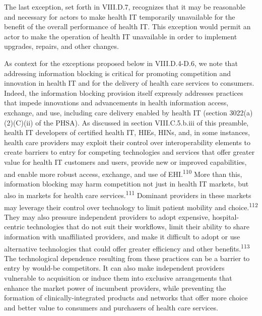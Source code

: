 \documentclass[twoside,11pt]{article}
\begin{document}
          The last exception, set forth in VIII.D.7, recognizes that it may be reasonable and necessary for actors to make health IT temporarily unavailable for the benefit of the overall performance of health IT. This exception would permit an actor to make the operation of health IT unavailable in order to implement upgrades, repairs, and other changes.


          As context for the exceptions proposed below in VIII.D.4-D.6, we note that addressing information blocking is critical for promoting competition and innovation in health IT and for the delivery of health care services to consumers. Indeed, the information blocking provision itself expressly addresses practices that impede innovations and advancements in health information access, exchange, and use, including care delivery enabled by health IT (section 3022(a)(2)(C)(ii) of the PHSA). As discussed in section VIII.C.5.b.iii of this preamble, health IT developers of certified health IT, HIEs, HINs, and, in some instances, health care providers may exploit their control over interoperability elements to create barriers to entry for competing technologies and services that offer greater value for health IT customers and users, provide new or improved capabilities, and enable more robust access, exchange, and use of EHI.\textsuperscript{110}
             More than this, information blocking may harm competition not just in health IT markets, but also in markets for health care services.\textsuperscript{111}
             Dominant providers in these markets may leverage their control over technology to limit patient mobility and choice.\textsuperscript{112}
             They may also pressure independent providers to adopt expensive, hospital-centric technologies that do not suit their workflows, limit their ability to share information with unaffiliated providers, and make it difficult to adopt or use alternative technologies that could offer greater efficiency and other benefits.\textsuperscript{113}
             The technological dependence resulting from these practices can be a barrier to entry by would-be competitors. It can also make independent providers vulnerable to acquisition or induce them into exclusive arrangements that enhance the market power of incumbent providers, while preventing the formation of clinically-integrated products and networks that offer more choice and better value to consumers and purchasers of health care services.


\end{document}
